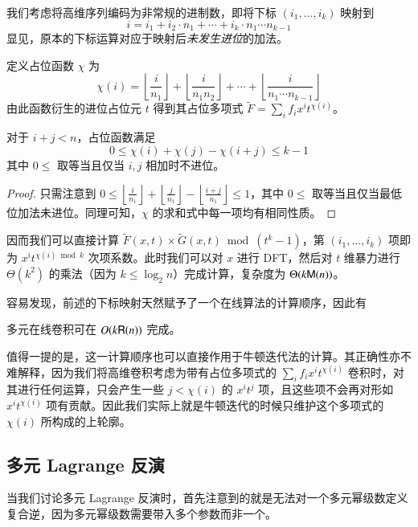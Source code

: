 我们考虑将高维序列编码为非常规的进制数，即将下标 $(i_1,\dots,i_k)$ 映射到
$$
i = i_1 + i_2\cdot n_1 + \cdots + i_k \cdot n_1\cdots n_{k-1}
$$
显见，原本的下标运算对应于映射后\emph{未发生进位}的加法。

\begin{definition}[进位占位元]
定义占位函数 $\chi$ 为
$$
\chi(i) = \left\lfloor \frac{i}{n_1}\right\rfloor + \left\lfloor \frac{i}{n_1n_2}\right\rfloor + \cdots + \left\lfloor \frac{i}{n_1\cdots n_{k-1}}\right\rfloor
$$
由此函数衍生的进位占位元 $t$ 得到其占位多项式 $\tilde F = \sum_i f_i x^i t^{\chi (i)}$。
\end{definition}

\begin{lemma}
对于 $i+j<n$，占位函数满足
$$
0\le \chi(i) + \chi(j) - \chi(i+j) \le k-1
$$
其中 $0\le $ 取等当且仅当 $i,j$ 相加时不进位。
\end{lemma}

\begin{proof}
只需注意到 $0\le \left\lfloor \frac{i}{n_1}\right\rfloor + \left\lfloor \frac{j}{n_1}\right\rfloor - \left\lfloor \frac{i+j}{n_1}\right\rfloor\le 1$，其中 $0\le $ 取等当且仅当最低位加法未进位。同理可知，$\chi$ 的求和式中每一项均有相同性质。
\end{proof}

因而我们可以直接计算 $\tilde F(x,t) \times \tilde G(x, t) \bmod (t^k-1)$，第 $(i_1,\dots,i_k)$ 项即为 $x^it^{\chi(i)\bmod k}$ 次项系数。此时我们可以对 $x$ 进行 DFT，然后对 $t$ 维暴力进行 $\Theta(k^2)$ 的乘法（因为 $k\le \log_2 n$）完成计算，复杂度为 $\Theta(k\mathsf M(n))$。

容易发现，前述的下标映射天然赋予了一个在线算法的计算顺序，因此有

\begin{lemma}
多元在线卷积可在 $O(k\mathsf R(n))$ 完成。
\end{lemma}

值得一提的是，这一计算顺序也可以直接作用于牛顿迭代法的计算。其正确性亦不难解释，因为我们将高维卷积考虑为带有占位多项式的 $\sum_i f_i x^i t^{\chi(i)}$ 卷积时，对其进行任何运算，只会产生一些 $j < \chi(i)$ 的 $x^it^j$ 项，且这些项不会再对形如 $x^it^{\chi(i)}$ 项有贡献。因此我们实际上就是牛顿迭代的时候只维护这个多项式的 $\chi(i)$ 所构成的上轮廓。

\subsection{多元 Lagrange 反演}

当我们讨论多元 Lagrange 反演时，首先注意到的就是无法对一个多元幂级数定义复合逆，因为多元幂级数需要带入多个参数而非一个。

